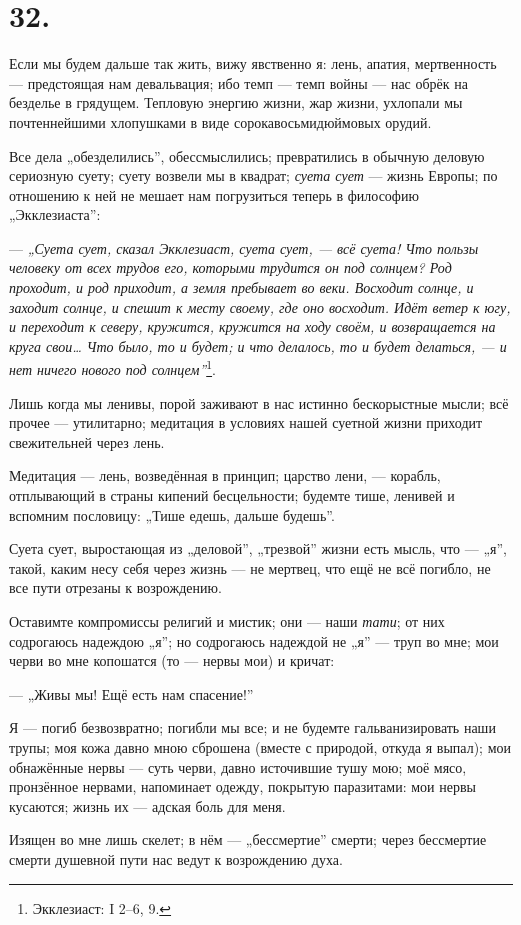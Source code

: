 \documentclass[12pt,a4paper,oneside]{book}
\begin{document}
\section*{32.}

Если мы будем дальше так жить, вижу явственно я: лень, апатия, мертвенность — предстоящая нам девальвация; ибо темп — темп войны — нас обрёк на безделье в грядущем. Тепловую энергию жизни, жар жизни, ухлопали мы почтеннейшими хлопушками в виде сорокавосьмидюймовых орудий.

Все дела „обезделились”, обессмыслились; превратились в обычную деловую сериозную суету; суету возвели мы в квадрат; \emph{суета сует} — жизнь Европы; по отношению к ней не мешает нам погрузиться теперь в философию „Экклезиаста”:

— \emph{„Суета сует, сказал Экклезиаст, суета сует, — всё суета! Что пользы человеку от всех трудов его, которыми трудится он под солнцем? Род проходит, и род приходит, а земля пребывает во веки. Восходит солнце, и заходит солнце, и спешит к месту своему, где оно восходит. Идёт ветер к югу, и переходит к северу, кружится, кружится на ходу своём, и возвращается на круга свои… Что было, то и будет; и что делалось, то и будет делаться, — и нет ничего нового под солнцем”}\footnote{Экклезиаст: I 2–6, 9.}.

Лишь когда мы ленивы, порой заживают в нас истинно бескорыстные мысли; всё прочее — утилитарно; медитация в условиях нашей суетной жизни приходит свежительней через лень.

Медитация — лень, возведённая в принцип; царство лени, — корабль, отплывающий в страны кипений бесцельности; будемте тише, ленивей и вспомним пословицу: „Тише едешь, дальше будешь”.

Суета сует, выростающая из „деловой”, „трезвой” жизни есть мысль, что — „я”, такой, каким несу себя через жизнь — не мертвец, что ещё не всё погибло, не все пути отрезаны к возрождению.

Оставимте компромиссы религий и мистик; они — наши \emph{тати}; от них содрогаюсь надеждою „я”; но содрогаюсь надеждой не „я” — труп во мне; мои черви во мне копошатся (то — нервы мои) и кричат:

— „Живы мы! Ещё есть нам спасение!”

Я — погиб безвозвратно; погибли мы все; и не будемте гальванизировать наши трупы; моя кожа давно мною сброшена (вместе с природой, откуда я выпал); мои обнажённые нервы — суть черви, давно источившие тушу мою; моё мясо, пронзённое нервами, напоминает одежду, покрытую паразитами: мои нервы кусаются; жизнь их — адская боль для меня.

Изящен во мне лишь скелет; в нём — „бессмертие” смерти; через бессмертие смерти душевной пути нас ведут к возрождению духа.
\end{document}
